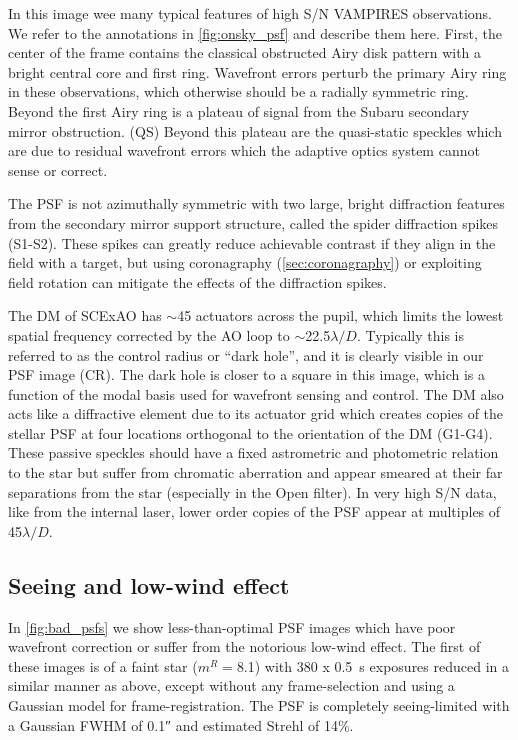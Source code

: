 In this image wee many typical features of high S/N VAMPIRES observations. We refer to the annotations in \autoref{fig:onsky_psf} and describe them here. First, the center of the frame contains the classical obstructed Airy disk pattern with a bright central core and first ring. Wavefront errors perturb the primary Airy ring in these observations, which otherwise should be a radially symmetric ring. Beyond the first Airy ring is a plateau of signal from the Subaru secondary mirror obstruction. (QS) Beyond this plateau are the quasi-static speckles which are due to residual wavefront errors which the adaptive optics system cannot sense or correct.

The PSF is not azimuthally symmetric with two large, bright diffraction features from the secondary mirror support structure, called the spider diffraction spikes (S1-S2). These spikes can greatly reduce achievable contrast if they align in the field with a target, but using coronagraphy (\autoref{sec:coronagraphy}) or exploiting field rotation can mitigate the effects of the diffraction spikes.

The DM of SCExAO has $\sim$45 actuators across the pupil, which limits the lowest spatial frequency corrected by the AO loop to $\sim$22.5$\lambda/D$. Typically this is referred to as the control radius or ``dark hole'', and it is clearly visible in our PSF image (CR). The dark hole is closer to a square in this image, which is a function of the modal basis used for wavefront sensing and control. The DM also acts like a diffractive element due to its actuator grid which creates copies of the stellar PSF at four locations orthogonal to the orientation of the DM (G1-G4). These passive speckles should have a fixed astrometric and photometric relation to the star but suffer from chromatic aberration and appear smeared at their far separations from the star (especially in the Open filter). In very high S/N data, like from the internal laser, lower order copies of the PSF appear at multiples of 45$\lambda/D$.

\subsection{Seeing and low-wind effect}
In \autoref{fig:bad_psfs} we show less-than-optimal PSF images which have poor wavefront correction or suffer from the notorious low-wind effect. The first of these images is of a faint star ($m^R=$8.1) with 380 x \SI{0.5}{\second} exposures reduced in a similar manner as above, except without any frame-selection and using a Gaussian model for frame-registration. The PSF is completely seeing-limited with a Gaussian FWHM of \ang{;;0.1} and estimated Strehl of 14\%. 

